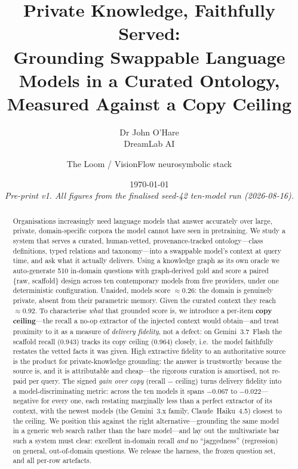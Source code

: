 \documentclass[11pt]{article}
\title{\vspace{-1.2cm}\bfseries Private Knowledge, Faithfully Served:\\[2pt]
Grounding Swappable Language Models in a Curated Ontology,\\ Measured Against a Copy Ceiling}
\author{Dr John O'Hare\\ \small DreamLab AI \and \small The Loom / VisionFlow neurosymbolic stack}
\date{\today\\[4pt]\small\textit{Pre-print v1. All figures from the finalised seed-42 ten-model run (2026-08-16).}}
\begin{document}
\maketitle

\begin{abstract}
\noindent
Organisations increasingly need language models that answer accurately over large, private,
domain-specific corpora the model cannot have seen in pretraining. We study a system that serves
a curated, human-vetted, provenance-tracked ontology---class definitions, typed relations and
taxonomy---into a swappable model's context at query time, and ask what it actually delivers.
Using a knowledge graph as its own oracle we auto-generate 510 in-domain questions with
graph-derived gold and score a paired \{raw, scaffold\} design across ten contemporary models
from five providers, under one deterministic configuration. Unaided, models score $\approx0.26$:
the domain is genuinely private, absent from their parametric memory. Given the curated context
they reach $\approx0.92$. To characterise \emph{what} that grounded score is, we introduce a
per-item \textbf{copy ceiling}---the recall a no-op extractor of the injected context would
obtain---and treat proximity to it as a measure of \emph{delivery fidelity}, not a defect: on
Gemini~3.7~Flash the scaffold recall (0.943) tracks its copy ceiling (0.964) closely, i.e.\ the
model faithfully restates the vetted facts it was given. High extractive fidelity to an
authoritative source is the product for private-knowledge grounding: the answer is trustworthy
because the source is, and it is attributable and cheap---the rigorous curation is amortised, not
re-paid per query. The signed \emph{gain over copy} (recall $-$ ceiling) turns delivery fidelity
into a model-discriminating metric:
across the ten models it spans $-0.067$ to $-0.022$---negative for every one, each restating
marginally less than a perfect extractor of its context, with the newest models (the Gemini~3.x
family, Claude~Haiku~4.5) closest to the ceiling. We position this against the
right alternative---grounding the same model in a generic web search rather than the bare
model---and lay out the multivariate bar such a system must clear: excellent in-domain recall
\emph{and} no ``jaggedness'' (regression) on general, out-of-domain questions. We release the
harness, the frozen question set, and all per-row artefacts.
\end{abstract}

\end{document}
